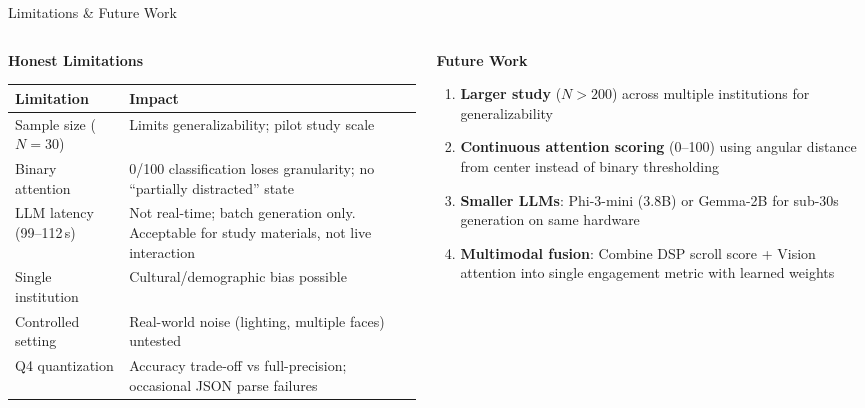 \documentclass[aspectratio=169,10pt]{beamer}
\begin{document}
\begin{frame}{Limitations \& Future Work}
\begin{columns}[T]
\begin{column}{0.48\textwidth}
\textbf{Honest Limitations}

\vspace{4pt}
\footnotesize
\begin{tabular}{@{}p{2.2cm}p{4.5cm}@{}}
\toprule
\textbf{Limitation} & \textbf{Impact} \\
\midrule
Sample size ($N{=}30$) & Limits generalizability; pilot study scale \\[4pt]
Binary attention & 0/100 classification loses granularity; no ``partially distracted'' state \\[4pt]
LLM latency (99--112\,s) & Not real-time; batch generation only. Acceptable for study materials, not live interaction \\[4pt]
Single institution & Cultural/demographic bias possible \\[4pt]
Controlled setting & Real-world noise (lighting, multiple faces) untested \\[4pt]
Q4 quantization & Accuracy trade-off vs full-precision; occasional JSON parse failures \\
\bottomrule
\end{tabular}
\end{column}

\begin{column}{0.48\textwidth}
\textbf{Future Work}

\vspace{4pt}
\footnotesize
\begin{enumerate}\scriptsize
  \item \textbf{Larger study} ($N > 200$) across multiple institutions for generalizability

  \item \textbf{Continuous attention scoring} (0--100) using angular distance from center instead of binary thresholding

  \item \textbf{Smaller LLMs}: Phi-3-mini (3.8B) or Gemma-2B for sub-30s generation on same hardware

  \item \textbf{Multimodal fusion}: Combine DSP scroll score + Vision attention into single engagement metric with learned weights


\end{enumerate}
\end{column}
\end{columns}
\end{frame}
\end{document}
